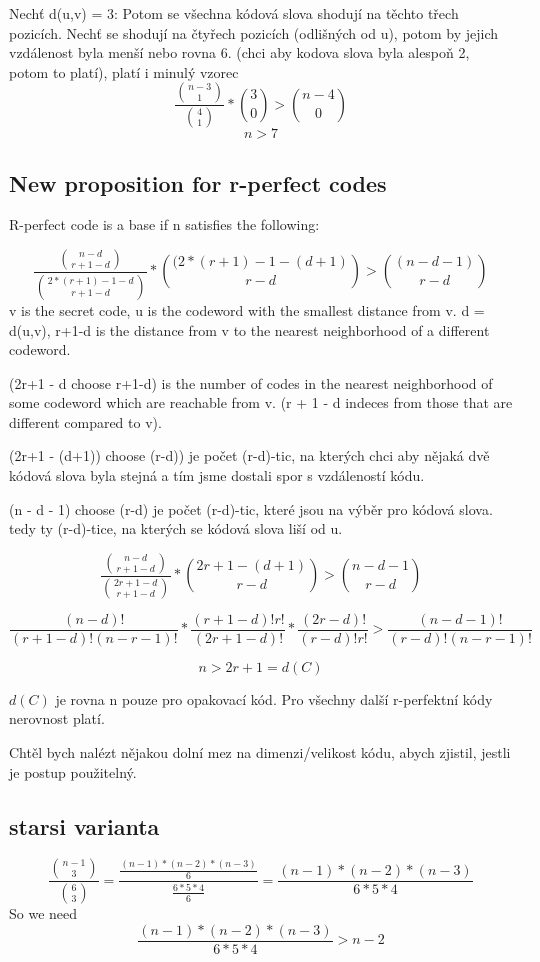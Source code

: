 Nechť d(u,v) = 3:
Potom se všechna kódová slova shodují na těchto třech pozicích. Nechť se shodují na čtyřech pozicích (odlišných od u), potom by jejich vzdálenost byla menší nebo rovna 6. (chci aby kodova slova byla alespoň 2, potom to platí), platí i minulý vzorec
\[ \frac{\binom{n-3}{1}}{\binom{4}{1}} * \binom{3}{0} > \binom{n-4}{0} \]
\[n > 7\]

\subsection{New proposition for r-perfect codes}
R-perfect code is a base if n satisfies the following:

\[ \frac{\binom{n-d}{r+1-d}}{\binom{2*(r+1) -1 - d}{r + 1 - d}} * \binom{(2*(r+1) -1 - (d+1)}{r-d} > \binom{(n - d - 1)}{r-d} \]
v is the secret code, u is the codeword with the smallest distance from v. 
d = d(u,v), r+1-d is the distance from v to the nearest neighborhood of a different codeword. 

(2r+1 - d choose r+1-d) is the number of codes in the nearest neighborhood of some codeword which are reachable from v. (r + 1 - d indeces from those that are different compared to v). 

(2r+1 - (d+1)) choose (r-d)) je počet (r-d)-tic, na kterých chci aby nějaká dvě kódová slova byla stejná a tím jsme dostali spor s vzdáleností kódu. 

(n - d - 1) choose (r-d) je počet (r-d)-tic, které jsou na výběr pro kódová slova. tedy ty (r-d)-tice, na kterých se kódová slova liší od u. 

\[ \frac{\binom{n-d}{r+1-d}}{\binom{2r+1 - d}{r + 1 - d}} * \binom{2r+1 - (d+1)}{r-d} > \binom{n - d - 1}{r-d} \]

\[ \frac{(n-d)!}{(r+1-d)!(n-r-1)!}*\frac{(r+1-d)!r!}{(2r+1 - d)!} * \frac{(2r - d)!}{(r-d)!r!} > \frac{(n - d - 1)!}{(r-d)!(n-r-1)!} \]

\[n > 2r + 1 = d(C)\]

$d(C)$ je rovna n pouze pro opakovací kód. Pro všechny další r-perfektní kódy nerovnost platí. 

Chtěl bych nalézt nějakou dolní mez na dimenzi/velikost kódu, abych zjistil, jestli je postup použitelný.

\subsection{starsi varianta}
\[
\frac{\binom{n-1}{3}}{\binom{6}{3}} = \frac{\frac{(n-1)*(n-2)*(n-3)}{6}}{\frac{6*5*4}{6}} = \frac{(n-1)*(n-2)*(n-3)}{6*5*4}
\]
So we need 
\[
\frac{(n-1)*(n-2)*(n-3)}{6*5*4} > n-2
\]

